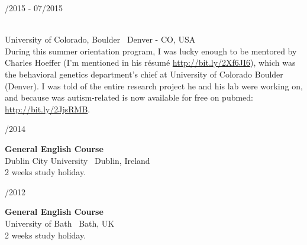 \begin{minipage}{.3\textwidth}
	/2015 - 07/2015 \faCalendar
\end{minipage}
\hfill
\begin{minipage}{.65\textwidth}
	\vfill
	 \\
	\color{Maroon} University of Colorado, Boulder \color{Sepia} \hfill \faMapMarker \ Denver - CO, USA
	\smallskip
	\\
	\color{gray} During this summer orientation program, I was lucky enough to be mentored by Charles Hoeffer (I'm mentioned in his résumé \url{http://bit.ly/2Xf6JI6}), which was the behavioral genetics department's chief at University of Colorado Boulder (Denver). I was told of the entire research project he and his lab were working on, and because was autism-related is now available for free on pubmed: \url{http://bit.ly/2JjsRMB}.
	\vfill
\end{minipage}

\bigskip

\begin{minipage}{.3\textwidth}
	/2014 \faCalendar
\end{minipage}
\hfill
\begin{minipage}{.65\textwidth}
	\vfill
	{\large \textbf{General English Course}} \\
	\color{Maroon} Dublin City University \color{Sepia} \hfill \faMapMarker \ Dublin, Ireland
	\smallskip \\
	\color{gray} 2 weeks study holiday.
	\vfill
\end{minipage}

\bigskip

\begin{minipage}{.3\textwidth}
	/2012 \faCalendar
\end{minipage}
\hfill
\begin{minipage}{.64\textwidth}
	\vfill
	{\large \textbf{General English Course}} \\
	\color{Maroon} University of Bath \color{Sepia} \hfill \faMapMarker \ Bath, UK 
	\smallskip \\
	\color{gray} 2 weeks study holiday.
	\vfill
\end{minipage}